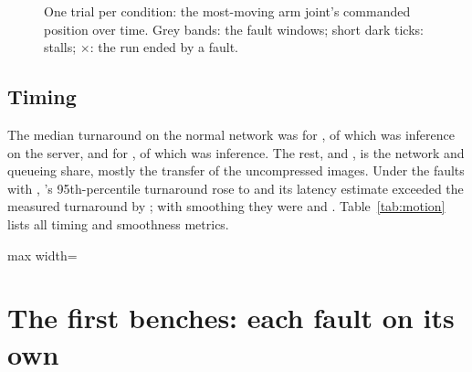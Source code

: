 \begin{figure}[htbp]
  \centering
  \caption{One \smolvla{} trial per condition: the most-moving arm joint's commanded position over time. Grey bands:
           the fault windows; short dark ticks: stalls; $\times$: the run ended by a fault.}
  \label{fig:timeline}
\end{figure}

\subsection{Timing}

The median turnaround on the normal network was  for \smolvla{}, of which
 was inference on the server, and  for \groot{}, of which
 was inference. The rest,  and ,
is the network and queueing share, mostly the transfer of the uncompressed images. Under the faults with \drtc{},
\groot's 95th-percentile turnaround rose to  and its latency estimate exceeded the measured
turnaround by ; with smoothing they were  and
. Table~\ref{tab:motion} lists all timing and smoothness metrics.

\begin{table}[htbp]
  \centering
  \small
  \begin{adjustbox}{max width=\textwidth}
  \end{adjustbox}
  \caption{Timing and smoothness, medians over trials. Condition numbers as in Table~\ref{tab:conditions1}.}\label{tab:motion}
\end{table}

\section{The first benches: each fault on its own}\label{sec:bench}

